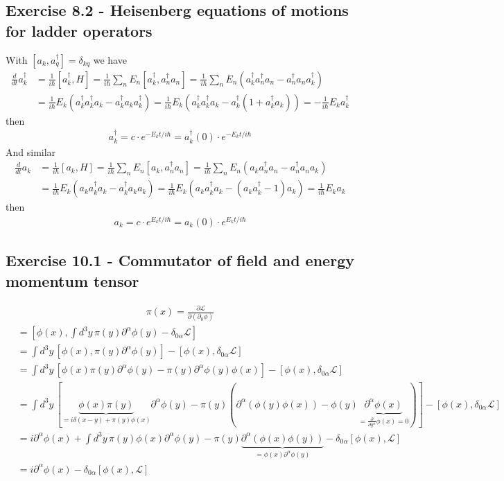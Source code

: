 \documentclass[../main.tex]{subfiles}
\begin{document}
\subsection*{Exercise 8.2 - Heisenberg equations of motions for ladder operators}
With $[a_k,a_q^\dagger]=\delta_{kq}$ we have 
\begin{align}
\frac{d}{dt}a_k^\dagger
&=\frac{1}{i\hbar}[a_k^\dagger,H]
=\frac{1}{i\hbar}\sum_nE_n[a_k^\dagger,a_n^\dagger a_n]
=\frac{1}{i\hbar}\sum_nE_n(a_k^\dagger a_n^\dagger a_n-a_n^\dagger a_na_k^\dagger)\\
&=\frac{1}{i\hbar}E_k(a_k^\dagger a_k^\dagger a_k-a_k^\dagger a_ka_k^\dagger)
=\frac{1}{i\hbar}E_k(a_k^\dagger a_k^\dagger a_k-a_k^\dagger(1+a_k^\dagger a_k))
=-\frac{1}{i\hbar}E_k a^\dagger_k
\end{align}
then
\begin{align}
a^\dagger_k=c\cdot e^{-E_kt/i\hbar}=a^\dagger_k(0)\cdot e^{-E_kt/i\hbar}
\end{align}
And similar
\begin{align}
\frac{d}{dt}a_k
&=\frac{1}{i\hbar}[a_k,H]
=\frac{1}{i\hbar}\sum_nE_n[a_k,a_n^\dagger a_n]
=\frac{1}{i\hbar}\sum_nE_n(a_k a^\dagger_n a_n-a_n^\dagger a_na_k)\\
&=\frac{1}{i\hbar}E_k(a_k a_k^\dagger a_k-a_k^\dagger a_ka_k)
=\frac{1}{i\hbar}E_k(a_k a_k^\dagger a_k -(a_k a_k^\dagger-1)a_k)
=\frac{1}{i\hbar}E_k a_k
\end{align}
then
\begin{align}
a_k=c\cdot e^{E_kt/i\hbar}=a_k(0)\cdot e^{E_kt/i\hbar}
\end{align}

\subsection*{Exercise 10.1 - Commutator of field and energy momentum tensor}
\begin{align}
\pi(x)=\frac{\partial\mathcal{L}}{\partial(\partial_0\phi)}
\end{align}
\begin{align}
[\phi(x),P^\alpha]
&=\left[\phi(x),\int d^3y\, \pi(y)\partial^\alpha\phi(y)-\delta_{0\alpha}\mathcal{L}\right]\\
&=\int d^3y\, \left[\phi(x),\pi(y)\partial^\alpha\phi(y)\right]-\left[\phi(x),\delta_{0\alpha}\mathcal{L}\right]\\
&=\int d^3y\, \left[\phi(x)\pi(y)\partial^\alpha\phi(y)-\pi(y)\partial^\alpha\phi(y)\phi(x)\right]-\left[\phi(x),\delta_{0\alpha}\mathcal{L}\right]\\
&=\int d^3y\, \left[\underbrace{\phi(x)\pi(y)}_{=i\delta(x-y)+\pi(y)\phi(x)}\partial^\alpha\phi(y)-\pi(y)(\partial^\alpha(\phi(y)\phi(x))-\phi(y)\underbrace{\partial^\alpha\phi(x)}_{=\frac{\partial}{\partial y^\alpha}\phi(x)=0})\right]-\left[\phi(x),\delta_{0\alpha}\mathcal{L}\right]\\
&=i\partial^\alpha\phi(x)+\int d^3y\,\pi(y)\phi(x)\partial^\alpha\phi(y)-\pi(y)\underbrace{\partial^\alpha(\phi(x)\phi(y))}_{=\phi(x)\partial^\alpha\phi(y)}-\delta_{0\alpha}[\phi(x),\mathcal{L}]\\
&=i\partial^\alpha\phi(x)-\delta_{0\alpha}[\phi(x),\mathcal{L}]
\end{align}
\end{document}
